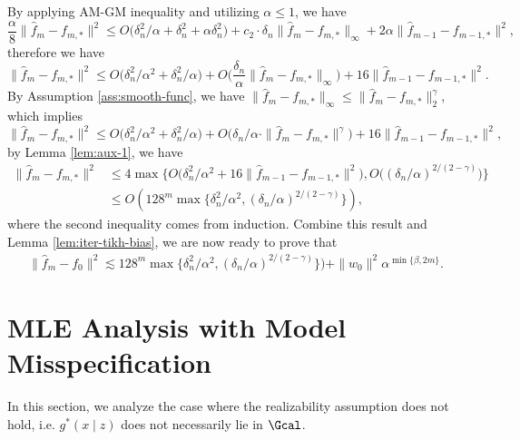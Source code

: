 \documentclass[12pt]{extarticle} %
\begin{document}
By applying AM-GM inequality and utilizing $\alpha\leq 1$, we have $$
\frac{\alpha}{8}\|\hat{f}_m - f_{m,*}\|^2 \leq O\big(\delta_n^2/\alpha + \delta_n^2 
+\alpha\delta_n^2\big) + c_2\cdot\delta_n \|\hat{f}_m - f_{m,*}\|_\infty + 2\alpha\|\hat{f}_{m-1} - f_{m-1,*}\|^2,
\label{eqn:strong-iterated}$$
therefore we have $$
\|\hat{f}_m - f_{m,*}\|^2 \leq O\big(\delta_n^2/\alpha^2 + \delta_n^2 /\alpha
\big) + O\bigg(\frac{\delta_n}{\alpha} \|\hat{f}_m - f_{m,*}\|_\infty\bigg)+ 16\|\hat{f}_{m-1} - f_{m-1,*}\|^2.
$$
By Assumption \ref{ass:smooth-func}, we have $\|\hat{f}_m - f_{m,*}\|_\infty \leq\|\hat{f}_m - f_{m,*}\|_2^\gamma $, which implies $$
\|\hat{f}_m - f_{m,*}\|^2 \leq O\big(\delta_n^2/\alpha^2 + \delta_n^2 /\alpha
\big) + O\bigg({\delta_n}/{\alpha} \cdot\|\hat{f}_m - f_{m,*}\|^\gamma\bigg)+ 16\|\hat{f}_{m-1} - f_{m-1,*}\|^2,
$$
by Lemma \ref{lem:aux-1}, we have \begin{align*}
    \|\hat{f}_m - f_{m,*}\|^2 &\leq 4\max\big\{O\big(\delta_n^2/\alpha^2 + 16\|\hat{f}_{m-1} - f_{m-1,*}\|^2 
\big), O\big((\delta_n/\alpha)^{2/(2-\gamma)}\big)\big\}\\
&\leq O(128^m \max\big\{\delta_n^2/\alpha^2, (\delta_n/\alpha)^{2/(2-\gamma)}\big\}),
\end{align*}
where the second inequality comes from induction.
Combine this result and Lemma \ref{lem:iter-tikh-bias}, we are now ready to prove that \begin{align}
    \|\hat{f}_m - f_0\|^2 \lesssim 128^m \max\big\{\delta_n^2/\alpha^2, (\delta_n/\alpha)^{2/(2-\gamma)}\big\}) + \|w_0\|^2 \alpha^{\min\{\beta, 2m\}}.
\end{align}
\section{MLE Analysis with Model Misspecification}
In this section, we analyze the case where the realizability assumption does not hold, i.e. $g^*(x\mid z)$ does not necessarily lie in $\Gcal$. 
\end{document}

